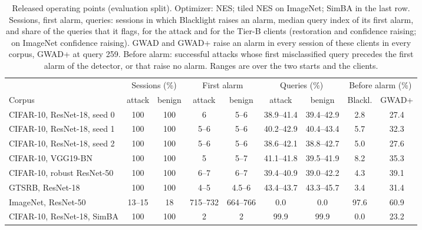 \begin{table}[!tbp]
\centering\footnotesize\setlength{\tabcolsep}{3pt}
\caption{Released operating points (evaluation split). Optimizer: NES; tiled NES on ImageNet; SimBA in the last row. Sessions, first alarm, queries: sessions in which Blacklight raises an alarm, median query index of its first alarm, and share of the queries that it flags, for the attack and for the Tier-B clients (restoration and confidence raising; on ImageNet confidence raising). GWAD and GWAD+ raise an alarm in every session of these clients in every corpus, GWAD+ at query 259. Before alarm: successful attacks whose first misclassified query precedes the first alarm of the detector, or that raise no alarm. Ranges are over the two starts and the clients.}
\label{tab:released}
\vspace{3pt}
\begin{adjustbox}{max width=\textwidth}
\begin{tabular}{lcccccccc}
\toprule
& \multicolumn{2}{c}{Sessions (\%)} & \multicolumn{2}{c}{First alarm} & \multicolumn{2}{c}{Queries (\%)} & \multicolumn{2}{c}{Before alarm (\%)} \\
\cmidrule(lr){2-3}\cmidrule(lr){4-5}\cmidrule(lr){6-7}\cmidrule(lr){8-9}
Corpus & attack & benign & attack & benign & attack & benign & Blackl. & GWAD+ \\
\midrule
CIFAR-10, ResNet-18, seed 0 & 100 & 100 & 6 & 5--6 & 38.9--41.4 & 39.4--42.9 & 2.8 & 27.4 \\
CIFAR-10, ResNet-18, seed 1 & 100 & 100 & 5--6 & 5--6 & 40.2--42.9 & 40.4--43.4 & 5.7 & 32.3 \\
CIFAR-10, ResNet-18, seed 2 & 100 & 100 & 5--6 & 5--6 & 38.6--42.1 & 38.8--42.7 & 5.0 & 27.6 \\
CIFAR-10, VGG19-BN & 100 & 100 & 5 & 5--7 & 41.1--41.8 & 39.5--41.9 & 8.2 & 35.3 \\
CIFAR-10, robust ResNet-50 & 100 & 100 & 6--7 & 6--7 & 39.4--40.9 & 39.0--42.2 & 4.3 & 39.1 \\
GTSRB, ResNet-18 & 100 & 100 & 4--5 & 4.5--6 & 43.4--43.7 & 43.3--45.7 & 3.4 & 31.4 \\
ImageNet, ResNet-50 & 13--15 & 18 & 715--732 & 664--766 & 0.0 & 0.0 & 97.6 & 60.9 \\
CIFAR-10, ResNet-18, SimBA & 100 & 100 & 2 & 2 & 99.9 & 99.9 & 0.0 & 23.2 \\
\bottomrule
\end{tabular}
\end{adjustbox}
\end{table}
